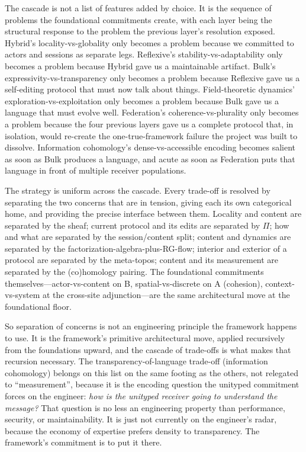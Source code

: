 \documentclass[11pt]{article}
\begin{document}
The cascade is not a list of features added by choice. It is the sequence of
problems the foundational commitments create, with each layer being the
structural response to the problem the previous layer's resolution exposed.
Hybrid's locality-vs-globality only becomes a problem because we committed to
actors and sessions as separate legs. Reflexive's stability-vs-adaptability
only becomes a problem because Hybrid gave us a maintainable artifact. Bulk's
expressivity-vs-transparency only becomes a problem because Reflexive gave us a
self-editing protocol that must now talk about things. Field-theoretic
dynamics' exploration-vs-exploitation only becomes a problem because Bulk gave
us a language that must evolve well. Federation's coherence-vs-plurality only
becomes a problem because the four previous layers gave us a complete protocol
that, in isolation, would re-create the one-true-framework failure the project
was built to dissolve. Information cohomology's dense-vs-accessible encoding
becomes salient as soon as Bulk produces a language, and acute as soon as
Federation puts that language in front of multiple receiver populations.

The strategy is uniform across the cascade. Every trade-off is resolved by
separating the two concerns that are in tension, giving each its own
categorical home, and providing the precise interface between them. Locality
and content are separated by the sheaf; current protocol and its edits are
separated by \(\Pi\); how and what are separated by the session/content split;
content and dynamics are separated by the factorization-algebra-plus-RG-flow;
interior and exterior of a protocol are separated by the meta-topos; content
and its measurement are separated by the (co)homology pairing. The foundational
commitments themselves---actor-vs-content on B, spatial-vs-discrete on A
(cohesion), context-vs-system at the cross-site adjunction---are the same
architectural move at the foundational floor.

So separation of concerns is not an engineering principle the framework
happens to use. It is the framework's primitive architectural move, applied
recursively from the foundations upward, and the cascade of trade-offs is what
makes that recursion necessary. The transparency-of-language trade-off
(information cohomology) belongs on this list on the same footing as the
others, not relegated to ``measurement'', because it is the encoding question
the unityped commitment forces on the engineer: \emph{how is the unityped
receiver going to understand the message?} That question is no less an
engineering property than performance, security, or maintainability. It is
just not currently on the engineer's radar, because the economy of expertise
prefers density to transparency. The framework's commitment is to put it there.
\end{document}
